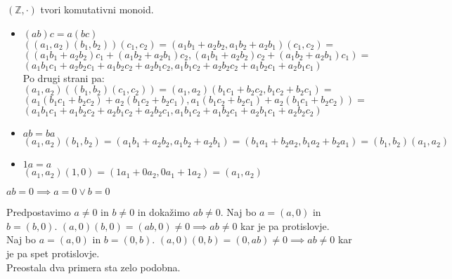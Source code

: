 \begin{trditev}
    $(\mathbb{Z}, \cdot)$ tvori komutativni monoid.
\end{trditev}
\begin{dokaz}
    \begin{itemize}
        \item $(ab)c = a(bc)$\\
        $((a_1,a_2)(b_1,b_2))(c_1,c_2) = (a_1 b_1 + a_2 b_2, a_1 b_2 + a_2 b_1)(c_1, c_2) = $\\
        $((a_1 b_1 + a_2 b_2)c_1 + (a_1 b_2 + a_2 b_1)c_2, (a_1 b_1 + a_2 b_2)c_2 + (a_1 b_2 + a_2 b_1)c_1) = $\\
        $(a_1 b_1 c_1 + a_2 b_2 c_1 + a_1 b_2 c_2 + a_2 b_1 c_2, a_1 b_1 c_2 + a_2 b_2 c_2 + a_1 b_2 c_1 + a_2 b_1 c_1)$ \\
        Po drugi strani pa:\\
        $(a_1,a_2)((b_1,b_2)(c_1,c_2)) = (a_1,a_2)(b_1 c_1 + b_2 c_2, b_1 c_2 + b_2 c_1) =$\\
        $(a_1(b_1 c_1 + b_2 c_2) + a_2(b_1 c_2 + b_2 c_1), a_1(b_1 c_2 + b_2 c_1) + a_2(b_1 c_1 + b_2 c_2)) =$\\
        $(a_1 b_1 c_1 + a_1 b_2 c_2 + a_2 b_1 c_2 + a_2 b_2 c_1, a_1 b_1 c_2 + a_1 b_2 c_1 + a_2 b_1 c_1 + a_2 b_2 c_2)$
        \item $ab = ba$\\
        $(a_1, a_2)(b_1, b_2) = (a_1 b_1 + a_2 b_2, a_1 b_2 + a_2 b_1) = (b_1 a_1 + b_2 a_2, b_1 a_2 + b_2 a_1) = (b_1, b_2)(a_1, a_2)$
        \item $1a = a$\\
        $(a_1, a_2)(1, 0) = (1 a_1 + 0 a_2, 0 a_1 + 1 a_2) = (a_1, a_2)$
    \end{itemize}
\end{dokaz}

\begin{trditev}
    $ab = 0 \implies a = 0 \vee b = 0$
\end{trditev}
\begin{dokaz}
    Predpostavimo $a \neq 0$ in $b \neq 0$ in dokažimo $ab \neq 0$.
    Naj bo $a = (a, 0)$ in $b = (b, 0)$.
    $(a, 0)(b, 0) = (ab, 0) \neq 0 \implies ab \neq 0$ kar je pa protislovje. \\
    Naj bo $a = (a, 0)$ in $b = (0, b)$.
    $(a, 0)(0, b) = (0, ab) \neq 0 \implies ab \neq 0$ kar je pa spet protislovje. \\
    Preostala dva primera sta zelo podobna.
\end{dokaz}

